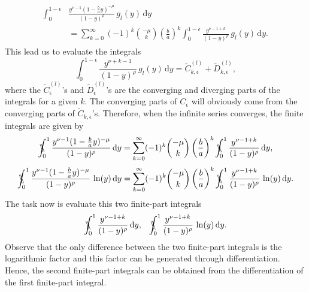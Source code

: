 \begin{align}
\begin{split}
    \int_0^{1-\epsilon} & \frac{y^{\nu-1} (1-\frac{b}{a} y)^{-\mu}}{(1-y)^{\rho}} \,g_l(y)\,  \mathrm{d}y \\& = \sum_{k=0}^{\infty} (-1)^k {-\mu \choose k}\left(\frac{b}{a}\right)^k \int_0^{1-\epsilon} \frac{y^{\nu-1+k}}{(1-y)^{\rho}}\,g_l(y)\,\mathrm{d}y.    
\end{split}
\end{align}
This lead us to evaluate the integrals
\begin{equation}\label{rawintegral}
\int_0^{1-\epsilon} \frac{y^{\nu+k-1}}{(1-y)^{\rho}}\,g_l(y)\,\mathrm{d}y=\tilde{C}^{(l)}_{k,\epsilon} + \tilde{D}^{(l)}_{k,\epsilon},
\end{equation}
where the $\tilde{C}^{(l)}_{\epsilon}$'s and $\tilde{D}^{(l)}_{\epsilon}$'s are the converging and diverging parts of the integrals for a given $k$. The converging parts of $C_{\epsilon}$ will obviously come from the converging parts of $\tilde{C}_{k,\epsilon}$'s. Therefore, when the infinite series converges, the finite integrals are given by
\begin{equation}\label{fpixxx}
\bbint{0}{1}\frac{y^{\nu-1} (1-\frac{b}{a} y)^{-\mu}}{(1-y)^{\rho}}\, \mathrm{d}y = \sum_{k=0}^{\infty} (-1)^k {-\mu \choose k}\left(\frac{b}{a}\right)^k \bbint{0}{1} \frac{y^{\nu-1+k}}{(1-y)^{\rho}}\,\mathrm{d}y ,
\end{equation}
\begin{equation}\label{fpixxx2}
\bbint{0}{1}\frac{y^{\nu-1} (1-\frac{b}{a} y)^{-\mu}}{(1-y)^{\rho}}\,\ln(y)\, \mathrm{d}y = \sum_{k=0}^{\infty} (-1)^k {-\mu \choose k}\left(\frac{b}{a}\right)^k \bbint{0}{1} \frac{y^{\nu-1+k}}{(1-y)^{\rho}}\,\ln(y)\,\mathrm{d}y.
\end{equation}
The task now is evaluate this two finite-part integrals
\begin{equation}
\bbint{0}{1} \frac{y^{\nu-1+k}}{(1-y)^{\rho}}\,\mathrm{d}y,\;\;\;
\bbint{0}{1} \frac{y^{\nu-1+k}}{(1-y)^{\rho}}\,\ln(y)\,\mathrm{d}y.
\end{equation}
Observe that the only difference between the two finite-part integrals is the logarithmic factor and this factor can be generated through differentiation. Hence, the second finite-part integrals can be obtained from the differentiation of the first finite-part integral. 

